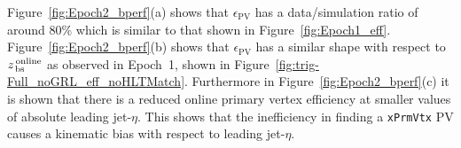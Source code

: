 Figure~\ref{fig:Epoch2_bperf}(a) shows that $\epsilon_{\text{PV}}$ has a data/simulation ratio of around 80\%  which is similar to that shown in Figure~\ref{fig:Epoch1_eff}.
Figure~\ref{fig:Epoch2_bperf}(b) shows that $\epsilon_{\text{PV}}$ has a similar shape with respect to  $z_{\,\text{bs}}^{\text{\,online}}$ as observed in Epoch~1,
shown in Figure~\ref{fig:trig-Full_noGRL_eff_noHLTMatch}.
Furthermore in Figure~\ref{fig:Epoch2_bperf}(c) it is shown that there is a reduced online primary vertex efficiency at smaller values of absolute leading jet-$\eta$.
This shows that the inefficiency in finding a \verb|xPrmVtx| PV causes a kinematic bias with respect to leading jet-$\eta$. %

\begin{figure}[!ht]
\begin{center}
  \captionsetup[subfigure]{aboveskip=0pt,justification=centering}
  \\

\end{center}
\end{figure}
